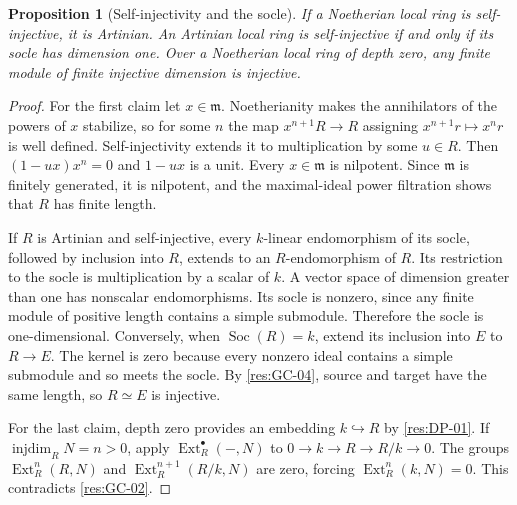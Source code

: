 \documentclass[11pt,oneside,openany]{book}
\newtheorem{proposition}[theorem]{Proposition}
\theoremstyle{definition}
\theoremstyle{remark}
\begin{document}
\begin{proposition}[Self-injectivity and the socle]\label{res:GC-05}
If a Noetherian local ring is self-injective, it is Artinian.
An Artinian local ring is self-injective if and only if its
socle has dimension one. Over a Noetherian local ring of depth
zero, any finite module of finite injective dimension is
injective.
\end{proposition}
\begin{proof}
For the first claim let $x\in\mathfrak m$. Noetherianity makes
the annihilators of the powers of $x$ stabilize, so for some
$n$ the map $x^{n+1}R\to R$ assigning $x^{n+1}r\mapsto x^n r$
is well defined. Self-injectivity extends it to multiplication
by some $u\in R$. Then $(1-ux)x^n=0$ and $1-ux$ is a unit.
Every $x\in\mathfrak m$ is nilpotent. Since $\mathfrak m$ is
finitely generated, it is nilpotent, and the maximal-ideal
power filtration shows that $R$ has finite length.

If $R$ is Artinian and self-injective, every $k$-linear
endomorphism of its socle, followed by inclusion into $R$,
extends to an $R$-endomorphism of $R$. Its restriction to the
socle is multiplication by a scalar of $k$. A vector space
of dimension greater than one has nonscalar endomorphisms. Its
socle is nonzero, since any finite module of positive length
contains a simple submodule. Therefore the socle is one-dimensional.
Conversely, when $\operatorname{Soc}(R)=k$, extend its inclusion
into $E$ to $R\to E$. The kernel is zero because every nonzero
ideal contains a simple submodule and so meets the socle.
By \ref{res:GC-04}, source and target have the same length,
so $R\simeq E$ is injective.

For the last claim, depth zero provides an embedding $k\hookrightarrow R$
by \ref{res:DP-01}. If $\operatorname{injdim}_R N=n>0$, apply
$\operatorname{Ext}_R^\bullet(-,N)$ to $0\to k\to R\to R/k\to0$.
The groups $\operatorname{Ext}^n_R(R,N)$ and
$\operatorname{Ext}^{n+1}_R(R/k,N)$ are zero, forcing
$\operatorname{Ext}^n_R(k,N)=0$. This contradicts
\ref{res:GC-02}.
\end{proof}
\end{document}
